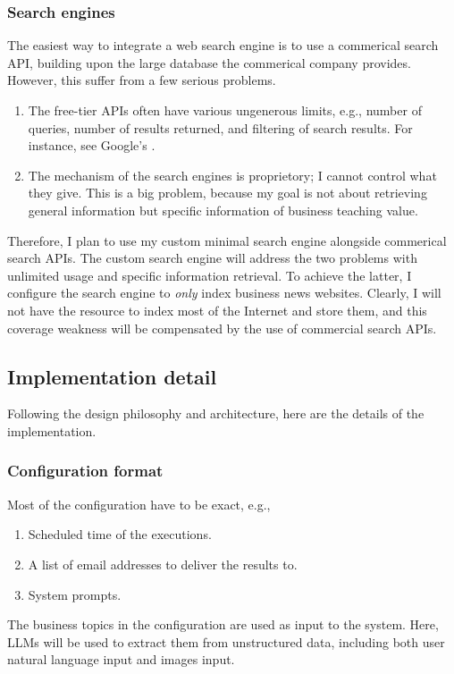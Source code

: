 \documentclass[final-report]{report-template}
\begin{document}
\subsubsection{Search engines} \label{sec.custom.search.engine}
The easiest way to integrate a web search engine is to use a commerical search
API, building upon the large database the commerical company provides.
However, this suffer from a few serious problems.
\begin{enumerate}
	\item 
	The free-tier APIs often have various ungenerous limits, e.g., number of
	queries, number of results returned, and filtering of search results.  For
	instance, see Google's \cite{search.api.limit.1}.
	\item
	The mechanism of the search engines is proprietory; I cannot control what
	they give. This is a big problem, because my goal is not about retrieving
	general information but specific information of business teaching value.
\end{enumerate}

Therefore, I plan to use my custom minimal search engine alongside commerical
search APIs. The custom search engine will address the two problems with
unlimited usage and specific information retrieval. To achieve the latter, I
configure the search engine to \emph{only} index business news websites.
Clearly, I will not have the resource to index most of the Internet and store
them, and this coverage weakness will be compensated by the use of commercial
search APIs.

\subsection{Implementation detail}
Following the design philosophy and architecture, here are the details of the
implementation.

\subsubsection{Configuration format} 
Most of the configuration have to be exact, e.g.,
\begin{enumerate}
	\item Scheduled time of the executions.
	\item A list of email addresses to deliver the results to.
	\item System prompts.
\end{enumerate}

The business topics in the configuration are used as input to the system.
Here, LLMs will be used to extract them from unstructured data, including
both user natural language input and images input.
\end{document}
